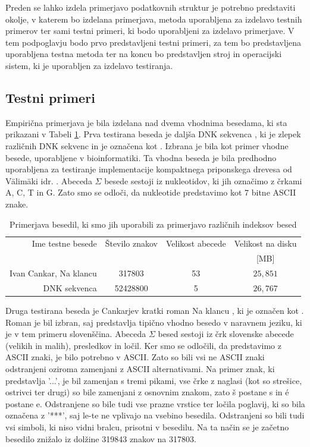 Preden se lahko izdela primerjavo podatkovnih struktur je potrebno predstaviti okolje, v katerem bo izdelana primerjava, metoda uporabljena za izdelavo testnih primerov ter sami testni primeri, ki bodo uporabljeni za izdelavo primerjave. V tem podpoglavju bodo prvo predstavljeni testni primeri, za tem bo predstavljena uporabljena testna metoda ter na koncu bo predstavljen stroj in operacijski sistem, ki je uporabljen za izdelavo testiranja. 

\subsection{Testni primeri}

Empirična primerjava je bila izdelana nad dvema vhodnima besedama, ki sta prikazani v Tabeli \ref{tab:besedila}. Prva testirana beseda je daljša DNK sekvenca \cite{podatki}, ki je zlepek različnih DNK sekvenc in je označena kot \DNK. Izbrana je bila kot primer vhodne besede, uporabljene v bioinformatiki. Ta vhodna beseda je bila predhodno uporabljena za testiranje implementacije kompaktnega priponskega drevesa od Välimäki idr. \cite{Valimaki2007}. Abeceda $\Sigma$ besede \DNK sestoji iz nukleotidov, ki jih označimo z črkami A, C, T in G. Zato smo se odloči, da nukleotide predstavimo kot 7 bitne ASCII znake.

\begin{table}[htb]
    \caption{Primerjava besedil, ki smo jih uporabili za primerjavo različnih indeksov besed}
    \label{tab:besedila}
    \centering
    \begin{tabular}{rccc}
        Ime testne besede& Število znakov & Velikost abecede & Velikost na disku \\
        &  &   & [MB]\\
         \hline
        Ivan Cankar, Na klancu \cite{podatkiNaKlancu}& 317803 & 53 & $25,851$ \\
        DNK sekvenca \cite{podatki}&  52428800& 5 & $26,767$ \\
    \end{tabular}    
\end{table}

Druga testirana beseda je Cankarjev kratki roman Na klancu \cite{podatkiNaKlancu}, ki je označen kot \NK. Roman je bil izbran, saj predstavlja tipično vhodno besedo v naravnem jeziku, ki je v tem primeru slovenščina. Abeceda $\Sigma$ besed \NK sestoji iz črk slovenske abecede (velikih in malih), presledkov in ločil. Ker smo se odločili, da predstavimo \DNK z ASCII znaki, je bilo potrebno \NK v ASCII. Zato so bili vsi ne ASCII znaki odstranjeni oziroma zamenjani z ASCII alternativami. Na primer znak, ki predstavlja '...', je bil zamenjan s tremi pikami, vse črke z naglasi (kot so strešice, ostrivci ter drugi) so bile zamenjani z osnovnim znakom, zato š postane s in é postane e. Odstranjene so bile tudi vse prazne vrstice ter ločila poglavij, ki so bila označena z '***', saj le-te ne vplivajo na vsebino besedila. Odstranjeni so bili tudi vsi simboli, ki niso vidni bralcu, prisotni v besedilu. Na ta način se je začetno besedilo znižalo iz dolžine 319843 znakov na 317803.

